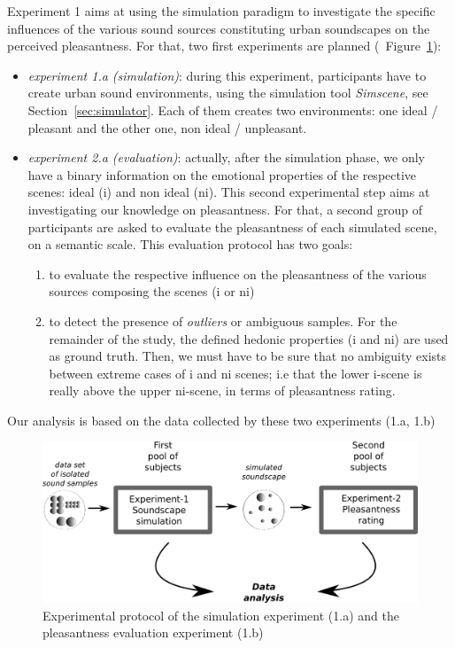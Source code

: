 \documentclass[twoside,twocolumn]{article}
\begin{document}
Experiment 1 aims at using the simulation paradigm to investigate the specific influences of the various sound sources constituting urban soundscapes on the perceived pleasantness. For that, two first experiments are planned (\cf~Figure~\ref{fig:xp1_2}):
\begin{itemize}
\item \emph{experiment 1.a (simulation)}: during this experiment, participants have to create urban sound environments, using the simulation tool \emph{Simscene}, see Section~\ref{sec:simulator}. Each of them creates two environments: one ideal / pleasant and the other one, non ideal / unpleasant.
\item \emph{experiment 2.a (evaluation)}: actually, after the simulation phase, we only have a binary information on the emotional properties of the respective scenes: ideal (i) and non ideal (ni). This second experimental step aims at investigating our knowledge on pleasantness. For that, a second group of participants are asked to evaluate the pleasantness of each simulated scene, on a semantic scale. This evaluation protocol has two goals:
\begin{enumerate}
\item to evaluate the respective influence on the pleasantness of the various sources composing the scenes (i or ni)
\item to detect the presence of \emph{outliers} or ambiguous samples. For the remainder of the study, the defined hedonic properties (i and ni) are used as ground truth. Then, we must have to be sure that no ambiguity exists between extreme cases of i and ni scenes; i.e that the lower i-scene is really above the upper ni-scene,  in terms of pleasantness rating.
\end{enumerate}
\end{itemize}

Our analysis is based on the data collected by these two experiments (1.a, 1.b)

\begin{figure}[t]
        \myfloatalign
        \includegraphics[width=\linewidth]{gfx/ch_5/5.png}
        \caption{Experimental protocol of the simulation experiment (1.a) and the pleasantness evaluation experiment (1.b)}\label{fig:xp1_2}
\end{figure}
\end{document}
